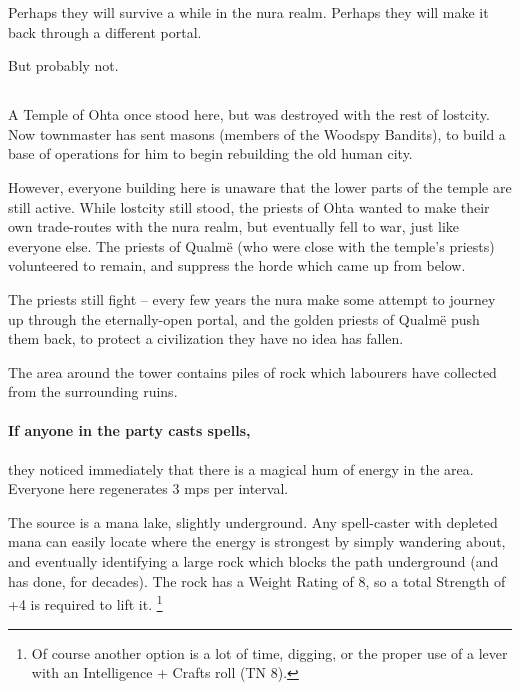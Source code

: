 \begin{multicols}{2}
Perhaps they will survive a while in the nura realm.
Perhaps they will make it back through a different portal.

But probably not.

\subsection{}
\label{green_tower}


A Temple of Ohta once stood here, but was destroyed with the rest of \gls{lostcity}.
Now \gls{townmaster} has sent masons (members of the Woodspy Bandits), to build a base of operations for him to begin rebuilding the old human city.

However, everyone building here is unaware that the lower parts of the temple are still active.
While \gls{lostcity} still stood, the priests of Ohta wanted to make their own trade-routes with the nura realm, but eventually fell to war, just like everyone else.
The priests of Qualm\"e (who were close with the temple's priests) volunteered to remain, and suppress the horde which came up from below.

The priests still fight -- every few years the nura make some attempt to journey up through the eternally-open portal, and the golden priests of Qualm\"e push them back, to protect a civilization they have no idea has fallen.


The area around the tower contains piles of rock which labourers have collected from the surrounding ruins.

\paragraph{If anyone in the party casts spells,}
they noticed immediately that there is a magical hum of energy in the area.
Everyone here regenerates 3 \glspl{mp} per \gls{interval}.

The source is a mana lake, slightly underground.
Any spell-caster with depleted mana can easily locate where the energy is strongest by simply wandering about, and eventually identifying a large rock which blocks the path underground (and has done, for decades).
The rock has a Weight Rating of 8, so a total Strength of +4 is required to lift it.%
\footnote{Of course another option is a lot of time, digging, or the proper use of a lever with an Intelligence + Crafts roll (TN 8).}


\end{multicols}
